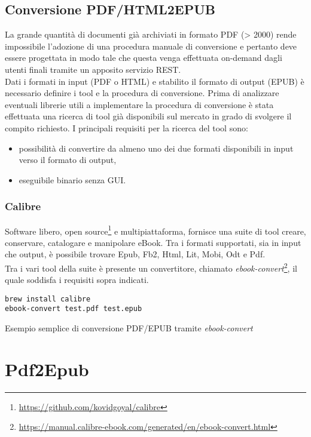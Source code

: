 \subsection{Conversione PDF/HTML2EPUB}
La grande quantità di documenti già archiviati in formato PDF (> 2000) rende impossibile l'adozione di una procedura manuale di conversione e pertanto deve essere progettata in modo tale che questa venga effettuata on-demand dagli utenti finali tramite un apposito servizio REST.\\
Dati i formati in input (PDF o HTML) e stabilito il formato di output (EPUB) è necessario definire i tool e la procedura di conversione. Prima di analizzare eventuali librerie utili a implementare la procedura di conversione è stata effettuata una ricerca di tool già disponibili sul mercato in grado di svolgere il compito richiesto. I principali requisiti per la ricerca del tool sono:
\begin{itemize}
    \item possibilità di convertire da almeno uno dei due formati disponibili in input verso il formato di output,
    \item eseguibile binario senza GUI.
\end{itemize}

\subsubsection{Calibre}
Software libero, open source\footnote{\url{https://github.com/kovidgoyal/calibre}} e multipiattaforma, fornisce una suite di tool creare, conservare, catalogare e manipolare eBook. Tra i formati supportati, sia in input che output, è possibile trovare Epub, Fb2, Html, Lit, Mobi, Odt e Pdf.\\
Tra i vari tool della suite è presente un convertitore, chiamato \textit{ebook-convert}\footnote{\url{https://manual.calibre-ebook.com/generated/en/ebook-convert.html}}, il quale soddisfa i requisiti sopra indicati.

\begin{listing}[H]
\begin{verbatim}
brew install calibre
ebook-convert test.pdf test.epub
\end{verbatim}
\caption{Esempio semplice di conversione PDF/EPUB tramite \textit{ebook-convert}}
\end{listing}

\section{Pdf2Epub}